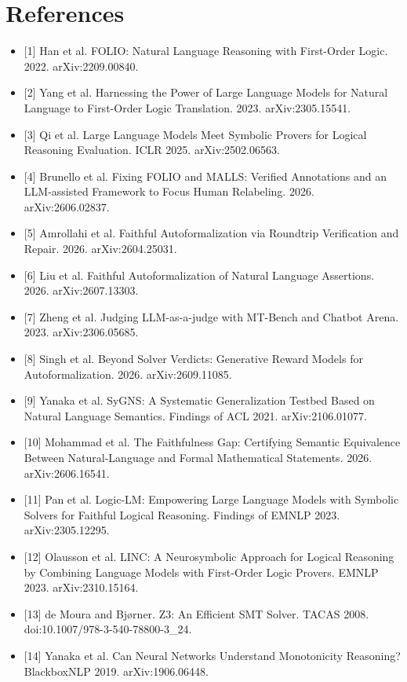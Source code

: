 \documentclass[11pt,letterpaper]{article}
\begin{document}
\section{References}

\begin{itemize}
\item {}[1] Han et al. FOLIO: Natural Language Reasoning with First-Order Logic. 2022. arXiv:2209.00840.
\item {}[2] Yang et al. Harnessing the Power of Large Language Models for Natural Language to First-Order Logic Translation. 2023. arXiv:2305.15541.
\item {}[3] Qi et al. Large Language Models Meet Symbolic Provers for Logical Reasoning Evaluation. ICLR 2025. arXiv:2502.06563.
\item {}[4] Brunello et al. Fixing FOLIO and MALLS: Verified Annotations and an LLM-assisted Framework to Focus Human Relabeling. 2026. arXiv:2606.02837.
\item {}[5] Amrollahi et al. Faithful Autoformalization via Roundtrip Verification and Repair. 2026. arXiv:2604.25031.
\item {}[6] Liu et al. Faithful Autoformalization of Natural Language Assertions. 2026. arXiv:2607.13303.
\item {}[7] Zheng et al. Judging LLM-as-a-judge with MT-Bench and Chatbot Arena. 2023. arXiv:2306.05685.
\item {}[8] Singh et al. Beyond Solver Verdicts: Generative Reward Models for Autoformalization. 2026. arXiv:2609.11085.
\item {}[9] Yanaka et al. SyGNS: A Systematic Generalization Testbed Based on Natural Language Semantics. Findings of ACL 2021. arXiv:2106.01077.
\item {}[10] Mohammad et al. The Faithfulness Gap: Certifying Semantic Equivalence Between Natural-Language and Formal Mathematical Statements. 2026. arXiv:2606.16541.
\item {}[11] Pan et al. Logic-LM: Empowering Large Language Models with Symbolic Solvers for Faithful Logical Reasoning. Findings of EMNLP 2023. arXiv:2305.12295.
\item {}[12] Olausson et al. LINC: A Neurosymbolic Approach for Logical Reasoning by Combining Language Models with First-Order Logic Provers. EMNLP 2023. arXiv:2310.15164.
\item {}[13] de Moura and Bj{\o}rner. Z3: An Efficient SMT Solver. TACAS 2008. doi:10.1007/978-3-540-78800-3\_\allowbreak{}24.
\item {}[14] Yanaka et al. Can Neural Networks Understand Monotonicity Reasoning? BlackboxNLP 2019. arXiv:1906.06448.

\end{itemize}
\end{document}
